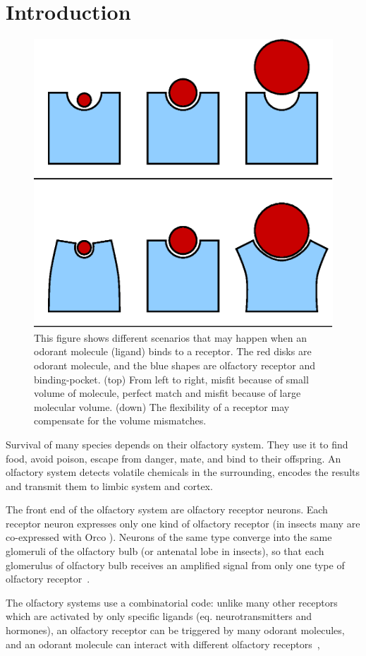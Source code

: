 \documentclass[11pt]{paper} %
\begin{document}
\section*{Introduction}
\begin{figure}
	\centering
	\includegraphics[width=0.4 \textwidth]{binding-pocket-size-flex}
	\caption{This figure shows different scenarios that may happen when an odorant molecule (ligand) binds to a receptor. 
		The red disks  are odorant molecule, 
		and the blue shapes are olfactory receptor and binding-pocket.	
		(top) From left to right, misfit because of small volume of molecule, 
		perfect match and misfit because of large molecular volume.
		(down) The flexibility of a receptor may compensate for the volume mismatches.
		}
	\label{fig:binding-pocket}
\end{figure}

Survival of many species depends on their olfactory system. 
They use it  to find food, 
avoid poison, 
escape from danger, 
mate, 
and bind to their offspring.
An olfactory system detects volatile chemicals in the surrounding, 
encodes the results and transmit them to limbic system and cortex.

The front end of the olfactory system are olfactory receptor neurons.  
Each receptor neuron expresses only one kind of olfactory receptor (in insects many are co-expressed with Orco \cite{Larsson2004}).
Neurons of the same type converge into the same glomeruli of the olfactory bulb (or antenatal lobe in insects),
so that each glomerulus of olfactory bulb receives an amplified signal from only one type of olfactory receptor~\cite{root2007,Carey2011,Vosshall2000,Couto2005,fishilevich2005,gao2000,wang1998,mombaerts1996,vassar1994}.

The olfactory systems use a combinatorial code: 
unlike many other receptors which are activated by only specific ligands (eq. neurotransmitters and hormones),
an olfactory receptor can be triggered by many odorant molecules, 
and an odorant molecule can interact with different olfactory receptors~\cite{Malnic2000},
\end{document}
